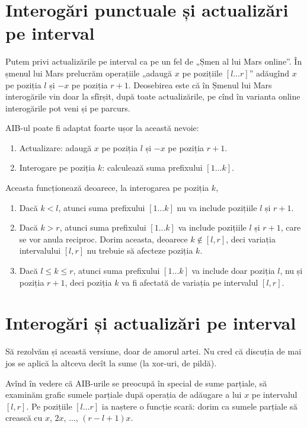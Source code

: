\documentclass[../main.tex]{subfiles}
\begin{document}
\section{Interogări punctuale și actualizări pe interval}

Putem privi actualizările pe interval ca pe un fel de „Șmen al lui Mars online”. În șmenul lui Mars prelucrăm operațiile „adaugă $x$ pe pozițiile $[l \dots r]$” adăugînd $x$ pe poziția $l$ și $-x$ pe poziția $r + 1$. Deosebirea este că în Șmenul lui Mars interogările vin doar la sfîrșit, după toate actualizările, pe cînd în varianta online interogările pot veni și pe parcurs.

AIB-ul poate fi adaptat foarte ușor la această nevoie:


\begin{enumerate}
  \item Actualizare: adaugă $x$ pe poziția $l$ și $-x$ pe poziția $r + 1$.
  \item Interogare pe poziția $k$: calculează suma prefixului $[1 \dots k]$.
\end{enumerate}

Aceasta funcționează deoarece, la interogarea pe poziția $k$,

\begin{enumerate}
  \item Dacă $k < l$, atunci suma prefixului $[1 \dots k]$ nu va include pozițiile $l$ și $r + 1$.
  \item Dacă $k > r$, atunci suma prefixului $[1 \dots k]$ va include pozițiile $l$ și $r + 1$, care se vor anula reciproc. Dorim aceasta, deoarece $k \not\in [l, r]$, deci variația intervalului $[l, r]$ nu trebuie să afecteze poziția $k$.
  \item Dacă $l \leq k \leq r$, atunci suma prefixului $[1 \dots k]$ va include doar poziția $l$, nu și poziția $r + 1$, deci poziția $k$ va fi afectată de variația pe intervalul $[l, r]$.
\end{enumerate}

\section{Interogări și actualizări pe interval}

Să rezolvăm și această versiune, doar de amorul artei. Nu cred că discuția de mai jos se aplică la altceva decît la sume (la xor-uri, de pildă).

Avînd în vedere că AIB-urile se preocupă în special de sume parțiale, să examinăm grafic sumele parțiale după operația de adăugare a lui $x$ pe intervalul $[l,r]$. Pe pozițiile $[l \dots r]$ ia naștere o funcție scară: dorim ca sumele parțiale să crească cu $x$, $2x$, ..., $(r - l + 1)x$.
\end{document}
